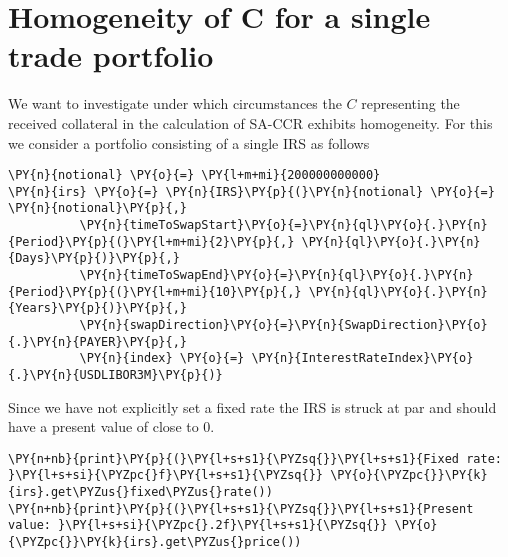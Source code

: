     

    
    \hypertarget{homogeneity-of-c-for-a-single-trade-portfolio}{%
\section{Homogeneity of C for a single trade
portfolio}\label{homogeneity-of-c-for-a-single-trade-portfolio}}

    We want to investigate under which circumstances the \(C\) representing
the received collateral in the calculation of SA-CCR exhibits
homogeneity. For this we consider a portfolio consisting of a single IRS
as follows

    \begin{tcolorbox}[breakable, size=fbox, boxrule=1pt, pad at break*=1mm,colback=cellbackground, colframe=cellborder]
\begin{Verbatim}[commandchars=\\\{\}]
\PY{n}{notional} \PY{o}{=} \PY{l+m+mi}{200000000000}
\PY{n}{irs} \PY{o}{=} \PY{n}{IRS}\PY{p}{(}\PY{n}{notional} \PY{o}{=} \PY{n}{notional}\PY{p}{,}
          \PY{n}{timeToSwapStart}\PY{o}{=}\PY{n}{ql}\PY{o}{.}\PY{n}{Period}\PY{p}{(}\PY{l+m+mi}{2}\PY{p}{,} \PY{n}{ql}\PY{o}{.}\PY{n}{Days}\PY{p}{)}\PY{p}{,}
          \PY{n}{timeToSwapEnd}\PY{o}{=}\PY{n}{ql}\PY{o}{.}\PY{n}{Period}\PY{p}{(}\PY{l+m+mi}{10}\PY{p}{,} \PY{n}{ql}\PY{o}{.}\PY{n}{Years}\PY{p}{)}\PY{p}{,}
          \PY{n}{swapDirection}\PY{o}{=}\PY{n}{SwapDirection}\PY{o}{.}\PY{n}{PAYER}\PY{p}{,}
          \PY{n}{index} \PY{o}{=} \PY{n}{InterestRateIndex}\PY{o}{.}\PY{n}{USDLIBOR3M}\PY{p}{)}
\end{Verbatim}
\end{tcolorbox}

    Since we have not explicitly set a fixed rate the IRS is struck at par
and should have a present value of close to 0.

    \begin{tcolorbox}[breakable, size=fbox, boxrule=1pt, pad at break*=1mm,colback=cellbackground, colframe=cellborder]
\begin{Verbatim}[commandchars=\\\{\}]
\PY{n+nb}{print}\PY{p}{(}\PY{l+s+s1}{\PYZsq{}}\PY{l+s+s1}{Fixed rate: }\PY{l+s+si}{\PYZpc{}f}\PY{l+s+s1}{\PYZsq{}} \PY{o}{\PYZpc{}}\PY{k}{irs}.get\PYZus{}fixed\PYZus{}rate())
\PY{n+nb}{print}\PY{p}{(}\PY{l+s+s1}{\PYZsq{}}\PY{l+s+s1}{Present value: }\PY{l+s+si}{\PYZpc{}.2f}\PY{l+s+s1}{\PYZsq{}} \PY{o}{\PYZpc{}}\PY{k}{irs}.get\PYZus{}price())
\end{Verbatim}
\end{tcolorbox}

